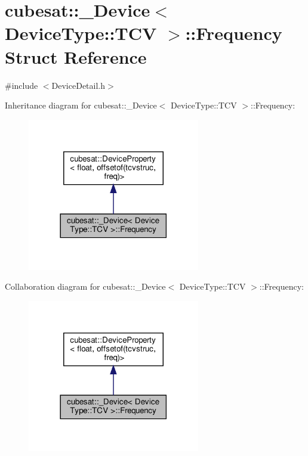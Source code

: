 \hypertarget{structcubesat_1_1__Device_3_01DeviceType_1_1TCV_01_4_1_1Frequency}{}\section{cubesat\+:\+:\+\_\+\+Device$<$ Device\+Type\+:\+:T\+CV $>$\+:\+:Frequency Struct Reference}
\label{structcubesat_1_1__Device_3_01DeviceType_1_1TCV_01_4_1_1Frequency}


{\ttfamily \#include $<$Device\+Detail.\+h$>$}



Inheritance diagram for cubesat\+:\+:\+\_\+\+Device$<$ Device\+Type\+:\+:T\+CV $>$\+:\+:Frequency\+:\nopagebreak
\begin{figure}[H]
\begin{center}
\leavevmode
\includegraphics[width=213pt]{structcubesat_1_1__Device_3_01DeviceType_1_1TCV_01_4_1_1Frequency__inherit__graph}
\end{center}
\end{figure}


Collaboration diagram for cubesat\+:\+:\+\_\+\+Device$<$ Device\+Type\+:\+:T\+CV $>$\+:\+:Frequency\+:\nopagebreak
\begin{figure}[H]
\begin{center}
\leavevmode
\includegraphics[width=213pt]{structcubesat_1_1__Device_3_01DeviceType_1_1TCV_01_4_1_1Frequency__coll__graph}
\end{center}
\end{figure}
